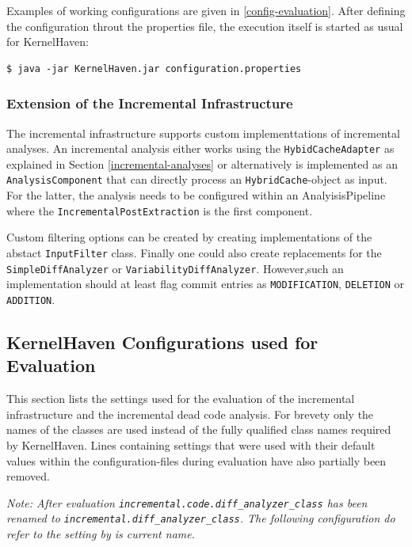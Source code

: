 \documentclass[a4paper]{article}
\begin{document}
Examples of working configurations are given in \autoref{config-evaluation}. After defining the configuration throut the properties file, the execution itself is started as usual for KernelHaven:

\begin{lstlisting}
$ java -jar KernelHaven.jar configuration.properties
\end{lstlisting}



\subsubsection{Extension of the Incremental Infrastructure}

The incremental infrastructure supports custom implementtations of incremental analyses. An incremental analysis either works using the \texttt{Hybid\-Cache\-Adapter} as explained in Section \ref{incremental-analyses} or alternatively is implemented as an \texttt{Analysis\-Component} that can directly process an \texttt{Hybrid\-Cache}-object as input. For the latter, the analysis needs to be configured within an AnalyisisPipeline where the \texttt{Incremental\-Post\-Extraction} is the first component.

Custom filtering options can be created by creating implementations of the abstact \texttt{InputFilter} class. Finally one could also create replacements for the \texttt{SimpleDiffAnalyzer} or \texttt{VariabilityDiffAnalyzer}. However,such an implementation should at least flag commit entries as \texttt{MODIFICATION}, \texttt{DELETION} or \texttt{ADDITION}.


\subsection{KernelHaven Configurations used for Evaluation} \label{config-evaluation}
This section lists the settings used for the evaluation of the incremental infrastructure and the incremental dead code analysis. For brevety only the names of the classes are used instead of the fully qualified class names required by KernelHaven. Lines containing settings that were used with their default values within the configuration-files during evaluation have also partially been removed.

\emph{Note: After evaluation \texttt{incremental.code.diff\_analyzer\_class} has been renamed to \texttt{incremental.diff\_analyzer\_class}. The following configuration do refer to the setting by is current name.}	
\end{document}
